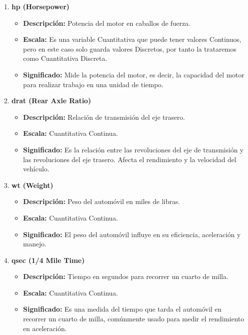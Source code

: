 \documentclass{article}
\begin{document}
\begin{enumerate}
    \item \textbf{hp (Horsepower)}

          \begin{itemize}
              \item \textbf{Descripción:} Potencia del motor en caballos de fuerza.
              \item \textbf{Escala:} Es una variable Cuantitativa que puede tener valores Continuos, pero en este caso solo guarda valores Discretos, por tanto la trataremos como Cuantitativa Discreta.
              \item \textbf{Significado:} Mide la potencia del motor, es decir, la capacidad del motor para realizar trabajo en una unidad de tiempo.
          \end{itemize}

    \item \textbf{drat (Rear Axle Ratio)}

          \begin{itemize}
              \item \textbf{Descripción:} Relación de transmisión del eje trasero.
              \item \textbf{Escala:} Cuantitativa Continua.
              \item \textbf{Significado:} Es la relación entre las revoluciones del eje de transmisión y las revoluciones del eje trasero. Afecta el rendimiento y la velocidad del vehículo.
          \end{itemize}

    \item \textbf{wt (Weight)}

          \begin{itemize}
              \item \textbf{Descripción:} Peso del automóvil en miles de libras.
              \item \textbf{Escala:} Cuantitativa Continua.
              \item \textbf{Significado:} El peso del automóvil influye en su eficiencia, aceleración y manejo.
          \end{itemize}

    \item \textbf{qsec (1/4 Mile Time)}

          \begin{itemize}
              \item \textbf{Descripción:} Tiempo en segundos para recorrer un cuarto de milla.
              \item \textbf{Escala:} Cuantitativa Continua.
              \item \textbf{Significado:} Es una medida del tiempo que tarda el automóvil en recorrer un cuarto de milla, comúnmente usado para medir el rendimiento en aceleración.
          \end{itemize}


\end{enumerate}
\end{document}
